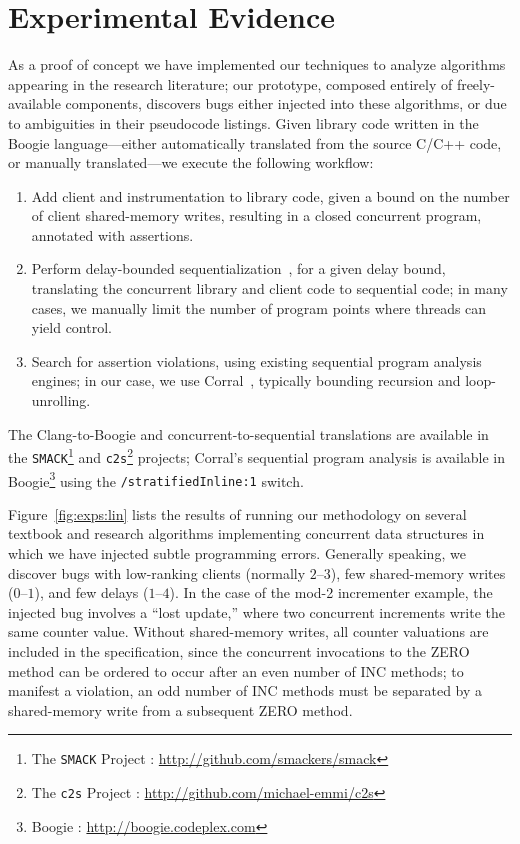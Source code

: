 \section{Experimental Evidence}
\label{sec:exp}

As a proof of concept we have implemented our techniques to analyze algorithms
appearing in the research literature; our prototype, composed entirely of
freely-available components, discovers bugs either injected into these
algorithms, or due to ambiguities in their pseudocode listings. Given library
code written in the Boogie language---either automatically translated from the
source C/C++ code, or manually translated---we execute the following workflow:
\vspace{-1eX}
\begin{enumerate}
  \item Add client and instrumentation to library code, given a bound on
    the number of client shared-memory writes, resulting in a closed concurrent 
    program, annotated with assertions.
  \item Perform delay-bounded sequentialization~\citep{ conf/popl/EmmiQR11},
    for a given delay bound, translating the concurrent library and client 
    code to sequential code; in many cases, we manually limit the number of 
    program points where threads can yield control.
  \item Search for assertion violations, using existing sequential program
    analysis engines; in our case, we use Corral~\citep{ conf/cav/LalQL12},
    typically bounding recursion and loop-unrolling.
    \vspace{-1eX}
\end{enumerate}
The Clang-to-Boogie and concurrent-to-sequential translations are available in
the {\tt SMACK}\footnote{The {\tt SMACK} Project :
\url{http://github.com/smackers/smack}} and {\tt c2s}\footnote{The {\tt c2s}
Project : \url{http://github.com/michael-emmi/c2s}} projects; Corral's
sequential program analysis is available in Boogie\footnote{Boogie :
\url{http://boogie.codeplex.com}} using the {\tt\small /stratifiedInline:1}
switch.

Figure~\ref{fig:exps:lin} lists the results of running our methodology on
several textbook and research algorithms implementing concurrent data
structures %
in which we have injected subtle
programming errors. Generally speaking, we discover bugs with low-ranking
clients (normally $2$--$3$), few shared-memory writes ($0$--$1$), and few
delays ($1$--$4$). In the case of the mod-2 incrementer example, the injected
bug involves a ``lost update,'' where two concurrent increments write the same
counter value. Without shared-memory writes, all counter valuations are
included in the specification, since the concurrent invocations to the ZERO
method can be ordered to occur after an even number of INC methods; to manifest
a violation, an odd number of INC methods must be separated by a shared-memory
write from a subsequent ZERO method.

